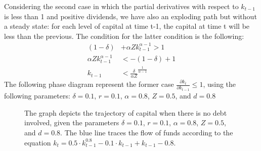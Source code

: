\documentclass[12pt]{article}
\begin{document}
Considering the second case in which the partial derivatives with respect to \(k_{t-1}\) is less than 1 and positive
dividends, we have also an exploding path but without a steady state: for each level of capital at time t-1, the
capital at time t will be less than the previous. The condition for the latter condition is the following:
\begin{align}
    \left(1-\delta\right) &+ \alpha Z k^{\alpha-1}_{t-1} > 1 \\
    \alpha Z k^{\alpha-1}_{t-1} &< - \left(1-\delta\right) +1 \\
    k_{t-1} &< {\frac{\delta}{\alpha Z}}^{\frac{1}{\alpha - 1}} \label{eq9'}
\end{align}
The following phase diagram represent the former case \(\frac{\partial{k_t}}{\partial k_{t-1}} \leq 1\), using the following
parameters: \(\delta =
0.1\), \(r = 0.1\), \(\alpha = 0.8\), \(Z = 0.5\), and \(d = 0.8\)
\begin{figure}
    \centering
    \caption{The graph depicts the trajectory of capital when there is no debt involved, given the parameters \(\delta =
    0.1\), \(r = 0.1\), \(\alpha = 0.8\), \(Z = 0.5\), and \(d = 0.8\). The blue line traces the flow of funds according
    to the equation \(k_{t} = 0.5 \cdot k_{t-1}^{0.8} - 0.1 \cdot k_{t-1} + k_{t-1} - 0.8\). }

\end{figure}
\end{document}
